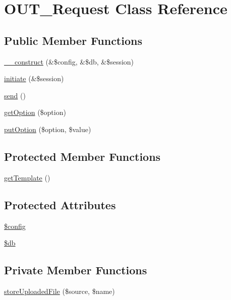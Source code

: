 \hypertarget{classOUT__Request}{
\section{OUT\_\-Request Class Reference}
\label{de/d53/classOUT__Request}
}
\subsection*{Public Member Functions}
\begin{DoxyCompactItemize}
\item 
\hyperlink{classOUT__Request_a749906f7ca9aeb506814d71f0215e380}{\_\-\_\-construct} (\&\$config, \&\$db, \&\$session)
\item 
\hyperlink{classOUT__Request_a825f77601714b2cb7510ab65d2d71483}{initiate} (\&\$session)
\item 
\hyperlink{classOUT__Request_acc60e320923329be1aa103406a4a3ee9}{send} ()
\item 
\hyperlink{classOUT__Request_aaa4a74668b18665c9408f57dd0556f98}{getOption} (\$option)
\item 
\hyperlink{classOUT__Request_ad1b829ea37ed35c67115e0886089d92d}{putOption} (\$option, \$value)
\end{DoxyCompactItemize}
\subsection*{Protected Member Functions}
\begin{DoxyCompactItemize}
\item 
\hyperlink{classOUT__Request_a2b3032d9a81143c98702d8b9344e6ba2}{getTemplate} ()
\end{DoxyCompactItemize}
\subsection*{Protected Attributes}
\begin{DoxyCompactItemize}
\item 
\hyperlink{classOUT__Request_a628de0ecf0318ef0459d1b1986bf2586}{\$config}
\item 
\hyperlink{classOUT__Request_ae2aa3cf43543978530ee50af4433f954}{\$db}
\end{DoxyCompactItemize}
\subsection*{Private Member Functions}
\begin{DoxyCompactItemize}
\item 
\hyperlink{classOUT__Request_a9b012befff9ae7c85396d42989067d83}{storeUploadedFile} (\$source, \$name)
\end{DoxyCompactItemize}
